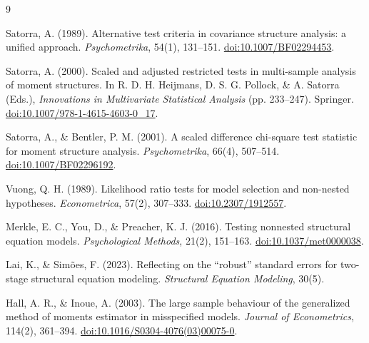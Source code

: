 \documentclass[11pt]{article}
\theoremstyle{plain}
\theoremstyle{remark}
\begin{document}
\begin{thebibliography}{9}

 Satorra, A. (1989). Alternative test criteria in
  covariance structure analysis: a unified approach. \emph{Psychometrika},
  54(1), 131--151.
  \href{https://doi.org/10.1007/BF02294453}{doi:10.1007/BF02294453}.

 Satorra, A. (2000). Scaled and adjusted restricted tests
  in multi-sample analysis of moment structures. In R. D. H. Heijmans, D. S. G.
  Pollock, \& A. Satorra (Eds.), \emph{Innovations in Multivariate Statistical
  Analysis} (pp. 233--247). Springer.
  \href{https://doi.org/10.1007/978-1-4615-4603-0_17}{doi:10.1007/978-1-4615-4603-0\_17}.

 Satorra, A., \& Bentler, P. M. (2001). A scaled
  difference chi-square test statistic for moment structure analysis.
  \emph{Psychometrika}, 66(4), 507--514.
  \href{https://doi.org/10.1007/BF02296192}{doi:10.1007/BF02296192}.

 Vuong, Q. H. (1989). Likelihood ratio tests for model
  selection and non-nested hypotheses. \emph{Econometrica}, 57(2), 307--333.
  \href{https://doi.org/10.2307/1912557}{doi:10.2307/1912557}.

 Merkle, E. C., You, D., \& Preacher, K. J. (2016).
  Testing nonnested structural equation models. \emph{Psychological Methods},
  21(2), 151--163.
  \href{https://doi.org/10.1037/met0000038}{doi:10.1037/met0000038}.

 Lai, K., \& Sim\~oes, F. (2023). Reflecting on the
  ``robust'' standard errors for two-stage structural equation modeling.
  \emph{Structural Equation Modeling}, 30(5).

 Hall, A. R., \& Inoue, A. (2003). The large sample
  behaviour of the generalized method of moments estimator in misspecified
  models. \emph{Journal of Econometrics}, 114(2), 361--394.
  \href{https://doi.org/10.1016/S0304-4076(03)00075-0}{doi:10.1016/S0304-4076(03)00075-0}.

\end{thebibliography}
\end{document}

